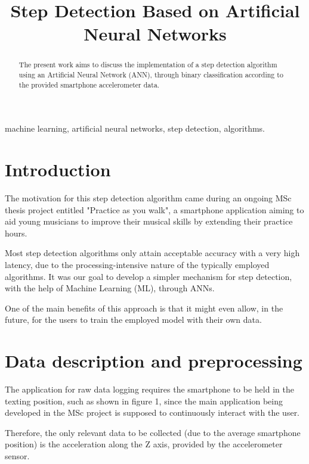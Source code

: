 \documentclass[conference]{IEEEtran}
\begin{document}
\title{Step Detection Based on Artificial Neural Networks
}

\author{
}

\maketitle
\thispagestyle{plain}
\pagestyle{plain}

\begin{abstract}
The present work aims to discuss the implementation of a step detection algorithm using an Artificial Neural Network (ANN), through binary classification according to the provided smartphone accelerometer data.
\end{abstract}

\begin{IEEEkeywords}
machine learning, artificial neural networks, step detection, algorithms.
\end{IEEEkeywords}

\section{Introduction}
The motivation for this step detection algorithm came during an ongoing MSc thesis project entitled "Practice as you walk", a smartphone application aiming to aid young musicians to improve their musical skills by extending their practice hours.\par
Most step detection algorithms only attain acceptable accuracy with a very high latency, due to the processing-intensive nature of the typically employed algorithms. It was our goal to develop a simpler mechanism for step detection, with the help of Machine Learning (ML), through ANNs.\par
One of the main benefits of this approach is that it might even allow, in the future, for the users to train the employed model with their own data. 

\section{Data description and preprocessing}
The application for raw data logging requires the smartphone to be held in the texting position, such as shown in figure 1, since the main application being developed in the MSc project is supposed to continuously interact with the user. \par
Therefore, the only relevant data to be collected (due to the average smartphone position) is the acceleration along the Z axis, provided by the accelerometer sensor.
\end{document}
